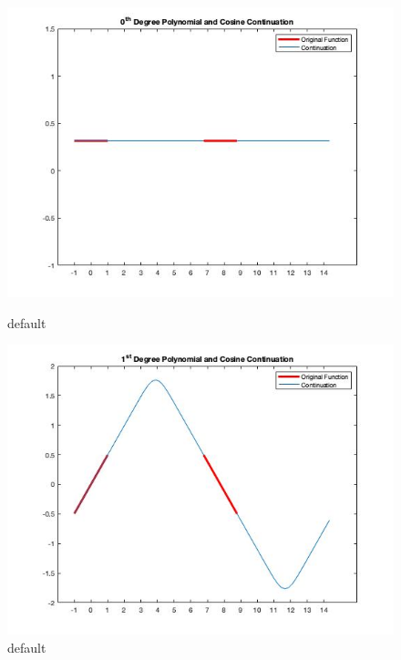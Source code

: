 \documentclass[11pt]{amsart}
\begin{document}
\begin{figure}[htbp]
\begin{center}
\includegraphics[scale=0.5]{ZeroDegreeCosineContinuation.jpg}
\caption{default}
\label{default}



\includegraphics[scale=0.5]{FirstDegreeContinuation.jpg}
\caption{default}
\label{default}




\end{center}
\end{figure}
\end{document}
